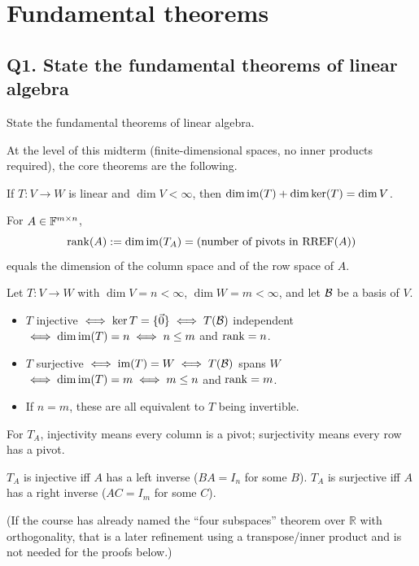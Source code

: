 \section{Fundamental theorems}

\subsection{Q1. State the fundamental theorems of linear algebra}

\begin{promptbox}
State the fundamental theorems of linear algebra.
\end{promptbox}

\begin{coursebox}
At the level of this midterm (finite-dimensional spaces, no inner products
required), the core theorems are the following.

\begin{theorem*}
If $T:V\to W$ is linear and $\dim V<\infty$, then
$\dim\operatorname{im}(T)+\dim\ker(T)=\dim V$.
\end{theorem*}

\begin{theorem*}[Rank]
For $A\in\mathbb{F}^{m\times n}$,
\[
\operatorname{rank}(A):=\dim\operatorname{im}(T_A)=\text{(number of pivots in $\operatorname{RREF}(A)$)}
\]
equals the dimension of the column space and of the row space of $A$.
\end{theorem*}

\begin{theorem*}
Let $T:V\to W$ with $\dim V=n<\infty$, $\dim W=m<\infty$, and let $\mathcal{B}$ be a
basis of $V$.
\begin{itemize}
\item $T$ injective $\iff\ker T=\{\vec{0}\}\iff T(\mathcal{B})$ independent
$\iff\dim\operatorname{im}(T)=n\iff n\le m$ and $\operatorname{rank}=n$.
\item $T$ surjective $\iff\operatorname{im}(T)=W\iff T(\mathcal{B})$ spans $W$
$\iff\dim\operatorname{im}(T)=m\iff m\le n$ and $\operatorname{rank}=m$.
\item If $n=m$, these are all equivalent to $T$ being invertible.
\end{itemize}
For $T_A$, injectivity means every column is a pivot; surjectivity means every
row has a pivot.
\end{theorem*}

\begin{theorem*}
$T_A$ is injective iff $A$ has a left inverse ($BA=I_n$ for some $B$).
$T_A$ is surjective iff $A$ has a right inverse ($AC=I_m$ for some $C$).
\end{theorem*}

(If the course has already named the ``four subspaces'' theorem over $\mathbb{R}$
with orthogonality, that is a later refinement using a transpose/inner product
and is not needed for the proofs below.)
\end{coursebox}

